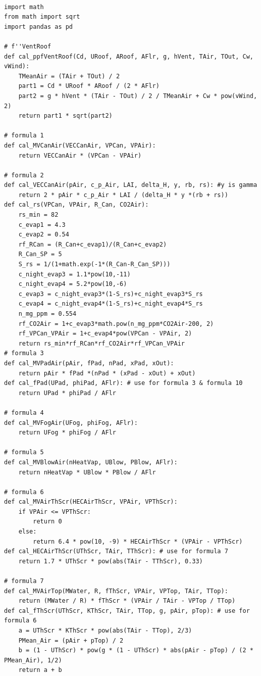 \documentclass[a4paper]{article}
\begin{document}
\begin{verbatim}
  
import math
from math import sqrt
import pandas as pd

# f''VentRoof
def cal_ppfVentRoof(Cd, URoof, ARoof, AFlr, g, hVent, TAir, TOut, Cw, vWind):
    TMeanAir = (TAir + TOut) / 2
    part1 = Cd * URoof * ARoof / (2 * AFlr)
    part2 = g * hVent * (TAir - TOut) / 2 / TMeanAir + Cw * pow(vWind, 2)
    return part1 * sqrt(part2)

# formula 1
def cal_MVCanAir(VECCanAir, VPCan, VPAir):
    return VECCanAir * (VPCan - VPAir)

# formula 2
def cal_VECCanAir(pAir, c_p_Air, LAI, delta_H, y, rb, rs): #y is gamma
    return 2 * pAir * c_p_Air * LAI / (delta_H * y *(rb + rs))
def cal_rs(VPCan, VPAir, R_Can, CO2Air):
    rs_min = 82
    c_evap1 = 4.3
    c_evap2 = 0.54
    rf_RCan = (R_Can+c_evap1)/(R_Can+c_evap2)
    R_Can_SP = 5
    S_rs = 1/(1+math.exp(-1*(R_Can-R_Can_SP)))
    c_night_evap3 = 1.1*pow(10,-11)
    c_night_evap4 = 5.2*pow(10,-6)
    c_evap3 = c_night_evap3*(1-S_rs)+c_night_evap3*S_rs
    c_evap4 = c_night_evap4*(1-S_rs)+c_night_evap4*S_rs
    n_mg_ppm = 0.554
    rf_CO2Air = 1+c_evap3*math.pow(n_mg_ppm*CO2Air-200, 2)
    rf_VPCan_VPAir = 1+c_evap4*pow(VPCan - VPAir, 2)
    return rs_min*rf_RCan*rf_CO2Air*rf_VPCan_VPAir
# formula 3
def cal_MVPadAir(pAir, fPad, nPad, xPad, xOut):
    return pAir * fPad *(nPad * (xPad - xOut) + xOut)
def cal_fPad(UPad, phiPad, AFlr): # use for formula 3 & formula 10
    return UPad * phiPad / AFlr

# formula 4
def cal_MVFogAir(UFog, phiFog, AFlr):
    return UFog * phiFog / AFlr

# formula 5
def cal_MVBlowAir(nHeatVap, UBlow, PBlow, AFlr):
    return nHeatVap * UBlow * PBlow / AFlr

# formula 6
def cal_MVAirThScr(HECAirThScr, VPAir, VPThScr):
    if VPAir <= VPThScr:
        return 0
    else:
        return 6.4 * pow(10, -9) * HECAirThScr * (VPAir - VPThScr)
def cal_HECAirThScr(UThScr, TAir, TThScr): # use for formula 7
    return 1.7 * UThScr * pow(abs(TAir - TThScr), 0.33)

# formula 7
def cal_MVAirTop(MWater, R, fThScr, VPAir, VPTop, TAir, TTop):
    return (MWater / R) * fThScr * (VPAir / TAir - VPTop / TTop)
def cal_fThScr(UThScr, KThScr, TAir, TTop, g, pAir, pTop): # use for formula 6
    a = UThScr * KThScr * pow(abs(TAir - TTop), 2/3)
    PMean_Air = (pAir + pTop) / 2
    b = (1 - UThScr) * pow(g * (1 - UThScr) * abs(pAir - pTop) / (2 * PMean_Air), 1/2)
    return a + b


\end{verbatim}
\end{document}
